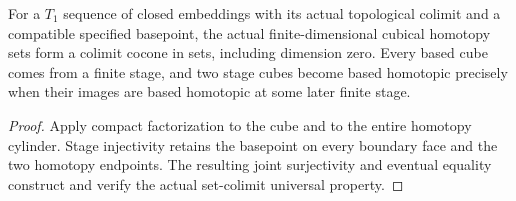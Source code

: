 \begin{proposition}
  \label{prop:actual-sequential-homotopy-colimit}
  \leanok
  For a $T_1$ sequence of closed embeddings with its actual topological colimit and a compatible specified basepoint, the actual finite-dimensional cubical homotopy sets form a colimit cocone in sets, including dimension zero. Every based cube comes from a finite stage, and two stage cubes become based homotopic precisely when their images are based homotopic at some later finite stage.
\end{proposition}
\begin{proof}
  Apply compact factorization to the cube and to the entire homotopy cylinder. Stage injectivity retains the basepoint on every boundary face and the two homotopy endpoints. The resulting joint surjectivity and eventual equality construct and verify the actual set-colimit universal property.
  \leanok
\end{proof}

